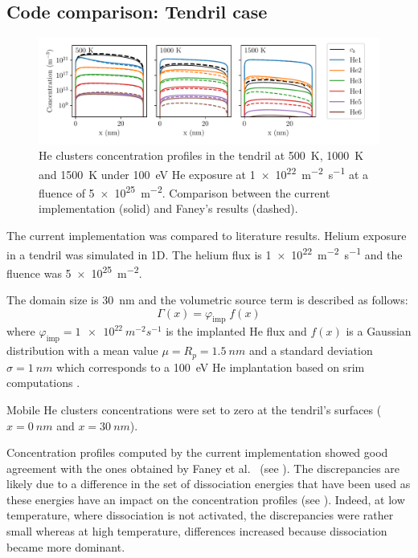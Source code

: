 \subsection{Code comparison: Tendril case} 

\begin{figure}
    \centering
    \includegraphics[width=\linewidth]{Figures/Chapter4/profiles_tendrils.pdf}
    \caption{He clusters concentration profiles in the \gls{tendril} at \SI{500}{K}, \SI{1000}{K} and \SI{1500}{K} under \SI{100}{eV} He exposure at \SI{1e22}{m^{-2}.s^{-1}} at a fluence of \SI{5e25}{m^{-2}}. Comparison between the current implementation (solid) and Faney's results \cite{faney_spatially_2015} (dashed).}
\end{figure}

The current implementation was compared to literature results\cite{faney_spatially_2015}.
Helium exposure in a \gls{tendril} was simulated in 1D.
The helium flux is \SI{1e22}{m^{-2}.s^{-1}} and the fluence was \SI{5e25}{m^{-2}}.

The domain size is \SI{30}{nm} and the volumetric source term is described as follows:
\begin{equation}
    \Gamma(x) = \varphi_\mathrm{imp} \; f(x) 
\end{equation}
where $\varphi_\mathrm{imp} = \SI{1e22}{m^{-2} s^{-1}}$ is the implanted He flux and $f(x)$ is a Gaussian distribution with a mean value $\mu = R_p = \SI{1.5}{nm}$ and a standard deviation $\sigma = \SI{1}{nm}$ which corresponds to a \SI{100}{eV} He implantation based on \gls{srim} computations .

Mobile He clusters concentrations were set to zero at the \gls{tendril}'s surfaces ($x=\SI{0}{nm}$ and $x=\SI{30}{nm}$).

Concentration profiles computed by the current implementation showed good agreement with the ones obtained by Faney et al.\ \cite{faney_spatially_2015} (see ).
The discrepancies are likely due to a difference in the set of dissociation energies that have been used as these energies have an impact on the concentration profiles (see ).
Indeed, at low temperature, where dissociation is not activated, the discrepancies were rather small whereas at high temperature, differences increased because dissociation became more dominant.

